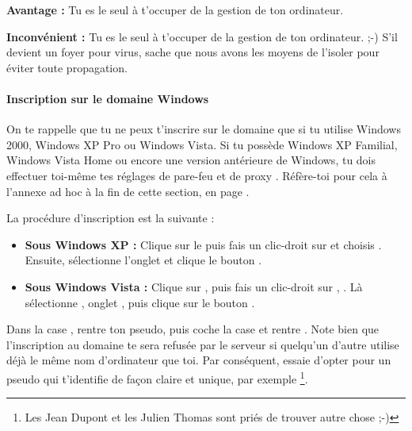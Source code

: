 \textbf{Avantage :} Tu es le seul \`a t'occuper de la gestion de ton ordinateur.

\textbf{Inconv\'enient :} Tu es le seul \`a t'occuper de la gestion de ton ordinateur. ;-)
S'il devient un foyer pour virus, sache que nous avons les moyens de l'isoler
pour \'eviter toute propagation.

\begin{center}
\end{center}


\paragraph{Inscription sur le domaine Windows}

On te rappelle que tu ne peux t'inscrire sur le domaine que si tu utilise
Windows 2000, Windows XP Pro ou Windows Vista. Si tu poss\`ede Windows XP
Familial, Windows Vista Home ou encore une version ant\'erieure de Windows,
tu dois effectuer toi-m\^eme tes r\'eglages de pare-feu et de proxy
. R\'ef\`ere-toi pour cela \`a l'annexe ad hoc \`a la fin de
cette section, en page \pageref{horsdomaine}.

La proc\'edure d'inscription est la suivante :
\begin{itemize}

\item \textbf{Sous Windows XP :} Clique sur le  puis fais un clic-droit sur
 et choisis . Ensuite, s\'electionne l'onglet  et clique le bouton .

\item \textbf{Sous Windows Vista :} Clique sur , puis fais un clic-droit sur , . L\`a s\'electionne , onglet , puis clique sur le bouton .

\end{itemize}

Dans la case , rentre ton pseudo, puis coche la case  et
rentre . Note bien que l'inscription au domaine te sera
refus\'ee par le serveur si quelqu'un d'autre utilise d\'ej\`a le m\^eme nom d'ordinateur que toi. Par
cons\'equent, essaie d'opter pour un pseudo qui t'identifie de fa\c{c}on claire et unique, par exemple
 \footnote{Les Jean Dupont et les Julien Thomas sont pri\'es de trouver autre chose
;-)}.

